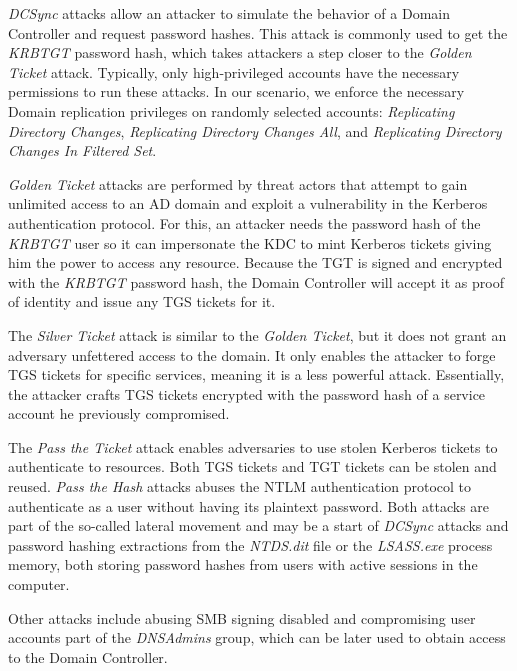 \textit{DCSync} attacks allow an attacker to simulate the behavior of a Domain Controller and request password hashes. This attack is commonly used to get the \textit{KRBTGT} password hash, which takes attackers a step closer to the \textit{Golden Ticket} attack. Typically, only high-privileged accounts have the necessary permissions to run these attacks. In our scenario, we enforce the necessary Domain replication privileges on randomly selected accounts: \textit{Replicating Directory Changes}, \textit{Replicating Directory Changes All}, and \textit{Replicating Directory Changes In Filtered Set}.

\textit{Golden Ticket} attacks are performed by threat actors that attempt to gain unlimited access to an AD domain and exploit a vulnerability in the Kerberos authentication protocol. For this, an attacker needs the password hash of the \textit{KRBTGT} user so it can impersonate the KDC to mint Kerberos tickets giving him the power to access any resource. Because the TGT is signed and encrypted with the \textit{KRBTGT} password hash, the Domain Controller will accept it as proof of identity and issue any TGS tickets for it.


The \textit{Silver Ticket} attack is similar to the \textit{Golden Ticket}, but it does not grant an adversary unfettered access to the domain. It only enables the attacker to forge TGS tickets for specific services, meaning it is a less powerful attack. Essentially, the attacker crafts TGS tickets encrypted with the password hash of a service account he previously compromised.

The \textit{Pass the Ticket} attack enables adversaries to use stolen Kerberos tickets to authenticate to resources. Both TGS tickets and TGT tickets can be stolen and reused. \textit{Pass the Hash} attacks abuses the NTLM authentication protocol to authenticate as a user without having its plaintext password. Both attacks are part of the so-called lateral movement and may be a start of \textit{DCSync} attacks and password hashing extractions from the \textit{NTDS.dit} file or the \textit{LSASS.exe} process memory, both storing password hashes from users with active sessions in the computer.

Other attacks include abusing SMB signing disabled and compromising user accounts part of the \textit{DNSAdmins} group, which can be later used to obtain access to the Domain Controller.


